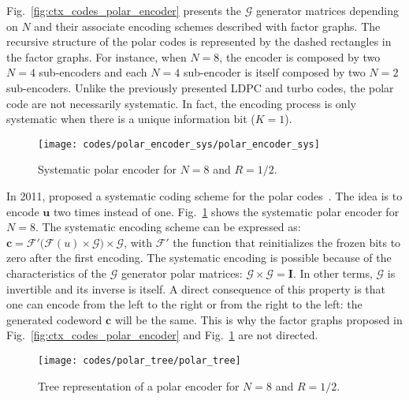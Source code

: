 Fig.~\ref{fig:ctx_codes_polar_encoder} presents the $\bm{\mathcal{G}}$ generator
matrices depending on $N$ and their associate encoding schemes described with
factor graphs. The recursive structure of the polar codes is represented by the
dashed rectangles in the factor graphs. For instance, when $N = 8$, the encoder
is composed by two $N = 4$ sub-encoders and each $N = 4$ sub-encoder is itself
composed by two $N = 2$ sub-encoders. Unlike the previously presented LDPC and
turbo codes, the polar code are not necessarily systematic. In fact, the
encoding process is only systematic when there is a unique information bit
($K =1$).

\begin{figure}[htp]
  \centering
  \texttt{[image: codes/polar\_encoder\_sys/polar\_encoder\_sys]}
  \caption{Systematic polar encoder for $N = 8$ and $R = 1/2$.}
  \label{fig:ctx_codes_polar_encoder_sys}
\end{figure}

In 2011, \Arikan proposed a systematic coding scheme for the polar
codes~\cite{Arikan2011}. The idea is to encode $\bm{u}$ two times instead of
one. Fig.~\ref{fig:ctx_codes_polar_encoder_sys} shows the systematic polar
encoder for $N = 8$. The systematic encoding scheme can be expressed as:
$\bm{c} = \mathcal{F'}\big(\mathcal{F}(u) \times \bm{\mathcal{G}}\big) \times
\bm{\mathcal{G}}$, with $\mathcal{F'}$ the function that reinitializes the
frozen bits to zero after the first encoding. The systematic encoding is
possible because of the characteristics of the $\bm{\mathcal{G}}$ generator
polar matrices: $\bm{\mathcal{G}} \times \bm{\mathcal{G}} = \bm{I}$. In other
terms, $\bm{\mathcal{G}}$ is invertible and its inverse is itself. A direct
consequence of this property is that one can encode from the left to the right
or from the right to the left: the generated codeword $\bm{c}$ will be the same.
This is why the factor graphs proposed in Fig.~\ref{fig:ctx_codes_polar_encoder}
and Fig.~\ref{fig:ctx_codes_polar_encoder_sys} are not directed.

\begin{figure}[htp]
  \centering
  \texttt{[image: codes/polar\_tree/polar\_tree]}
  \caption{Tree representation of a polar encoder for $N = 8$ and $R = 1/2$.}
  \label{fig:ctx_codes_polar_tree}
\end{figure}

